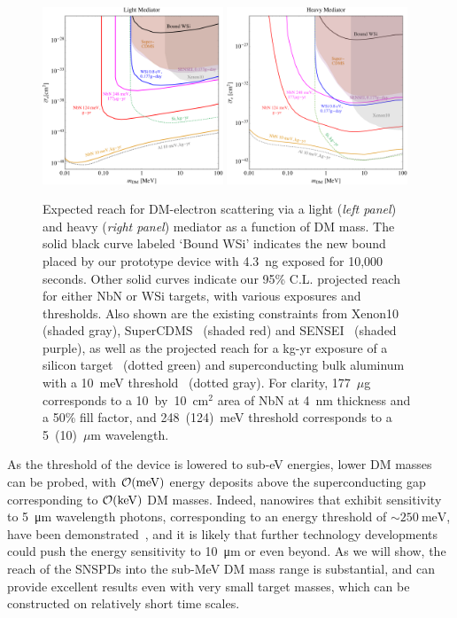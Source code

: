 \documentclass[twocolumn,10pt,prl,nofootinbib,preprintnumbers]{revtex4-1}
\begin{document}
\begin{figure}[t!]
\includegraphics[width=0.48\textwidth]{Plots/SNSPD_light_med_final.pdf} 
\includegraphics[width=0.48\textwidth]{Plots/SNSPD_heavy_med_final.pdf} 
\caption{\label{fig:scat} Expected reach for DM-electron scattering
  via a light ({\it left panel}) and heavy ({\it right panel})
  mediator as a function of DM mass.  The solid black curve labeled `Bound WSi' indicates the
  new bound placed by our prototype device with 4.3~ng exposed for 10,000 seconds. Other solid curves
  indicate our 95\% C.L. projected reach for either NbN or WSi
  targets, with various exposures and thresholds. Also shown are the existing
  constraints from Xenon10~\cite{Essig:2012yx} (shaded gray),
  SuperCDMS~\cite{Agnese:2018col} (shaded red) and
  SENSEI~\cite{Abramoff:2019dfb} (shaded purple), as well as the projected
  reach for a kg-yr exposure of a silicon target~\cite{Essig:2015cda} (dotted green)
  and superconducting bulk aluminum with a 10~meV
  threshold~\cite{Hochberg:2015pha,Hochberg:2015fth} (dotted gray).  For clarity, 177~$\mu$g
  corresponds to a 10~by~10~cm$^2$  area of NbN at 4~nm
  thickness and a 50\% fill factor, and 248~(124)~meV threshold
  corresponds to a 5~(10)~$\mu$m wavelength.  }
\end{figure}

As the threshold of the device is lowered to sub-eV energies, lower DM
masses can be probed, with ${\cal O}({\rm meV})$ energy deposits above the superconducting gap corresponding to ${\cal O}({\rm keV})$ DM
masses. Indeed, nanowires that exhibit sensitivity to \SI{5}{\um}
wavelength photons, corresponding to an energy threshold of
$\sim\SI{250}{\milli\electronvolt}$, have been
demonstrated~\cite{Marsili2012}, and it is likely that further
technology developments could push the energy sensitivity to
\SI{10}{\um} or even beyond. As we will show, the reach of the SNSPDs
into the sub-MeV DM mass range is substantial, and can provide
excellent results even with very small target masses, which can be
constructed on relatively short time scales.
\end{document}
